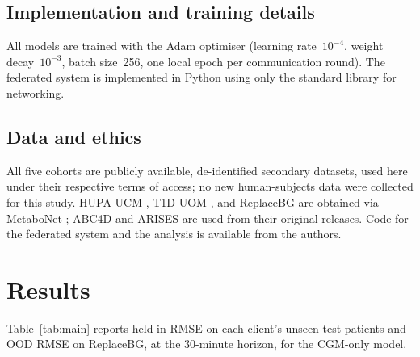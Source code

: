 \documentclass[10pt,letterpaper]{article}
\begin{document}
\subsection*{Implementation and training details}

All models are trained with the Adam optimiser (learning rate~$10^{-4}$, weight
decay~$10^{-3}$, batch size~256, one local epoch per communication round). The
federated system is implemented in Python using only the standard library for
networking.

\subsection*{Data and ethics}

All five cohorts are publicly available, de-identified secondary datasets, used
here under their respective terms of access; no new human-subjects data were
collected for this study. HUPA-UCM \cite{hidalgo2024hupaucm}, T1D-UOM
\cite{alsuhaymi2025t1duom}, and ReplaceBG \cite{aleppo2017replacebg} are obtained
via MetaboNet \cite{wolff2026metabonet}; ABC4D and ARISES are used from their
original releases. Code for the federated system and the analysis is available
from the authors.

\section*{Results}

Table~\ref{tab:main} reports held-in RMSE on each client's unseen test patients
and OOD RMSE on ReplaceBG, at the 30-minute horizon, for the CGM-only model.
\end{document}
